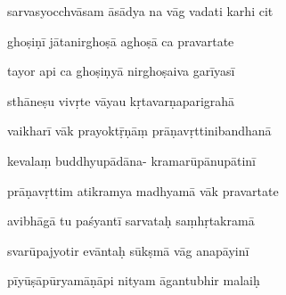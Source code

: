 \documentclass[article,12pt,a4paper]{memoir}%
\newcounter{parCount}
\begin{document}
	  
	  \pstart \leavevmode%
	sarvasyocchvāsam āsādya na vāg vadati karhi cit 
	{}
	\pend%
      

	  
	  \pstart {} ghoṣiṇī jātanirghoṣā aghoṣā ca pravartate 
	{}
	\pend%
      

	  
	  \pstart \leavevmode%
	tayor api ca ghoṣiṇyā nirghoṣaiva garīyasī 
	{}
	\pend%
      

	  
	  \pstart {} sthāneṣu vivṛte vāyau kṛtavarṇaparigrahā 
	{}
	\pend%
      

	  
	  \pstart \leavevmode%
	vaikharī vāk prayoktṝṇāṃ prāṇavṛttinibandhanā 
	{}
	\pend%
      

	  
	  \pstart {} kevalaṃ buddhyupādāna- kramarūpānupātinī 
	{}
	\pend%
      

	  
	  \pstart \leavevmode%
	prāṇavṛttim atikramya madhyamā vāk pravartate 
	{}
	\pend%
      

	  
	  \pstart {} avibhāgā tu paśyantī sarvataḥ saṃhṛtakramā 
	{}
	\pend%
      

	  
	  \pstart \leavevmode%
	svarūpajyotir evāntaḥ sūkṣmā vāg anapāyinī 
	{}
	\pend%
      

	  
	  \pstart {} pīyūṣāpūryamāṇāpi nityam āgantubhir malaiḥ 
	{}
	\pend%
      
\end{document}
